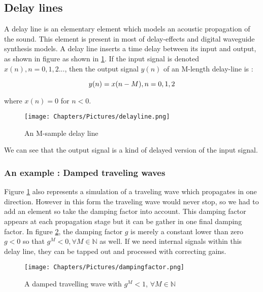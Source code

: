 \subsection{Delay lines}

A delay line is an elementary element which models an acoustic propagation of the sound. This element is present in most of delay-effects and digital waveguide synthesis models. A delay line inserts a time delay between its input and output, as shown in figure as shown in \ref{fig:delay-line}.
If the input signal is denoted $x(n), n = 0, 1, 2 ...$, then the output signal $y(n)$ of an M-length delay-line is :

\begin{equation}
    \centering
    y(n) = x(n-M), n = 0, 1, 2
\end{equation}

where $x(n) = 0$ for $n < 0$.


\begin{figure}[h]
    \centering
    \texttt{[image: Chapters/Pictures/delayline.png]}
    \caption{An M-sample delay line}
    \label{fig:delay-line}
\end{figure}

We can see that the output signal is a kind of delayed version of the input signal.

\subsubsection*{An example : Damped traveling waves}

Figure \ref{fig:delay-line} also represents a simulation of a traveling wave which propagates in one direction. However in this form the traveling wave would never stop, so we had to add an element so take the damping factor into account. This damping factor appears at each propagation stage but it can be gather in one final damping factor. In figure \ref{fig:dampingwave}, the damping factor $g$ is merely a constant lower than zero $g < 0$ so that $g^{M} < 0, \forall M \in \mathbb{N}$ as well. If we need internal signals within this delay line, they can be tapped out and processed with correcting gains.

\begin{figure}[h]
    \centering
    \texttt{[image: Chapters/Pictures/dampingfactor.png]}
    \caption{A damped travelling wave with $g^{M} < 1$, $\forall M \in \mathbb{N}$}
    \label{fig:dampingwave}
\end{figure}

